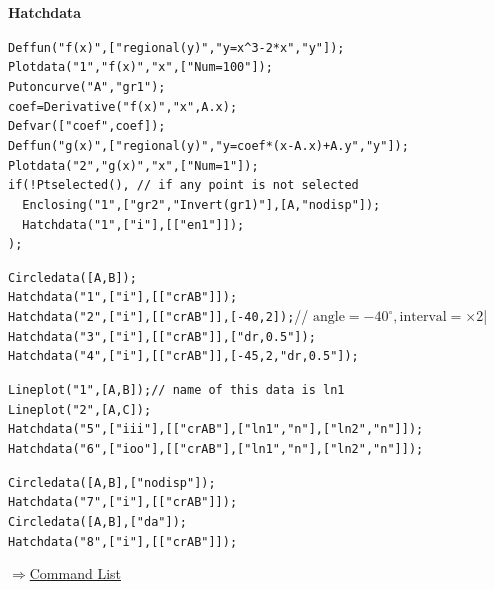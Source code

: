 \documentclass[papersize,a4paper,12pt]{article}
\newenvironment{cmd}[2]{
\hypertarget{#2}{}
\begin{center}{\bf\large #1}\end{center}
\begin{description}
}{
\end{description}
\begin{flushright} \hyperlink{functionlist}{$\Rightarrow$Command List}\end{flushright}
}
\begin{document}
\begin{cmd}{Hatchdata}{hatchdata}
\verb|Deffun("f(x)",["regional(y)","y=x^3-2*x","y"]);|\\
\verb|Plotdata("1","f(x)","x",["Num=100"]);|\\
\verb|Putoncurve("A","gr1");|\\
\verb|coef=Derivative("f(x)","x",A.x);|\\
\verb|Defvar(["coef",coef]);|\\
\verb|Deffun("g(x)",["regional(y)","y=coef*(x-A.x)+A.y","y"]);|\\
\verb|Plotdata("2","g(x)","x",["Num=1"]);|\\
\verb|if(!Ptselected(), // if any point is not selected|\\
\verb|  Enclosing("1",["gr2","Invert(gr1)"],[A,"nodisp"]);|\\
\verb|  Hatchdata("1",["i"],[["en1"]]);|\\
\verb|);|

\begin{center}

\end{center}

\verb|Circledata([A,B]);|\\
\verb|Hatchdata("1",["i"],[["crAB"]]);|\\
\verb|Hatchdata("2",["i"],[["crAB"]],[-40,2]);|// $\mbox{angle}=-40^{\circ}, \mbox{interval}=\times 2$|\\
\verb|Hatchdata("3",["i"],[["crAB"]],["dr,0.5"]);|\\
\verb|Hatchdata("4",["i"],[["crAB"]],[-45,2,"dr,0.5"]);|

\begin{center}

\end{center}

\verb|Lineplot("1",[A,B]);// name of this data is ln1|\\
\verb|Lineplot("2",[A,C]);|\\
\verb|Hatchdata("5",["iii"],[["crAB"],["ln1","n"],["ln2","n"]]);|\\
\verb|Hatchdata("6",["ioo"],[["crAB"],["ln1","n"],["ln2","n"]]);|

\begin{center}
\hspace{10mm}
\end{center}

\verb|Circledata([A,B],["nodisp"]);|\\
\verb|Hatchdata("7",["i"],[["crAB"]]);|\\
\verb|Circledata([A,B],["da"]);|\\
\verb|Hatchdata("8",["i"],[["crAB"]]);|

\begin{center}
\hspace{10mm}
\end{center}

\end{cmd}
\end{document}
